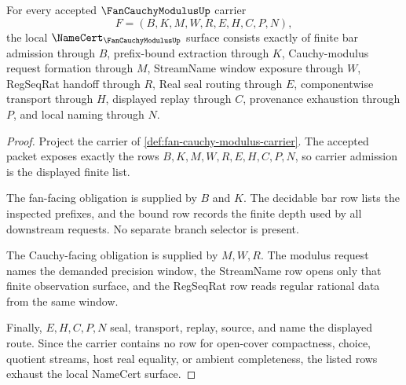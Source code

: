 \begin{theorem}
\label{thm:fan-cauchy-modulus-namecert-obligations}
For every accepted $\FanCauchyModulusUp$ carrier
$$
F=(B,K,M,W,R,E,H,C,P,N),
$$
the local $\NameCert_{\FanCauchyModulusUp}$ surface consists exactly of finite bar admission through $B$, prefix-bound extraction through $K$, Cauchy-modulus request formation through $M$, StreamName window exposure through $W$, RegSeqRat handoff through $R$, Real seal routing through $E$, componentwise transport through $H$, displayed replay through $C$, provenance exhaustion through $P$, and local naming through $N$.
\end{theorem}
\begin{proof}
Project the carrier of \autoref{def:fan-cauchy-modulus-carrier}. The accepted packet exposes exactly the rows $B,K,M,W,R,E,H,C,P,N$, so carrier admission is the displayed finite list.

The fan-facing obligation is supplied by $B$ and $K$. The decidable bar row lists the inspected prefixes, and the bound row records the finite depth used by all downstream requests. No separate branch selector is present.

The Cauchy-facing obligation is supplied by $M,W,R$. The modulus request names the demanded precision window, the StreamName row opens only that finite observation surface, and the RegSeqRat row reads regular rational data from the same window.

Finally, $E,H,C,P,N$ seal, transport, replay, source, and name the displayed route. Since the carrier contains no row for open-cover compactness, choice, quotient streams, host real equality, or ambient completeness, the listed rows exhaust the local NameCert surface.
\end{proof}

